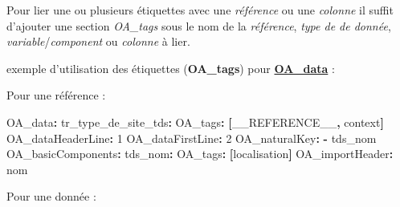 \documentclass[
  letterpaper,
  DIV=11,
  numbers=noendperiod]{scrartcl}
\newenvironment{Shaded}{\begin{snugshade}}{\end{snugshade}}
\newcommand{\AttributeTok}[1]{\textcolor[rgb]{0.40,0.45,0.13}{#1}}
\newcommand{\DecValTok}[1]{\textcolor[rgb]{0.68,0.00,0.00}{#1}}
\newcommand{\FunctionTok}[1]{\textcolor[rgb]{0.28,0.35,0.67}{#1}}
\newcommand{\KeywordTok}[1]{\textcolor[rgb]{0.00,0.23,0.31}{\textbf{#1}}}
\begin{document}
Pour lier une ou plusieurs étiquettes avec une \emph{référence} ou une
\emph{colonne} il suffit d'ajouter une section \emph{OA\_tags} sous le
nom de la \emph{référence}, \emph{type de de donnée},
\emph{variable}/\emph{component} ou \emph{colonne} à lier.

exemple d'utilisation des étiquettes (\textbf{OA\_tags}) pour
\hyperref[data]{\textbf{OA\_data}} :

Pour une référence :

\begin{Shaded}
\begin{Highlighting}[]
\FunctionTok{OA\_data}\KeywordTok{:}
\AttributeTok{  }\FunctionTok{tr\_type\_de\_site\_tds}\KeywordTok{:}
\AttributeTok{    }\FunctionTok{OA\_tags}\KeywordTok{:}\AttributeTok{ }\KeywordTok{[}\AttributeTok{\_\_REFERENCE\_\_}\KeywordTok{,}\AttributeTok{ context}\KeywordTok{]}
\AttributeTok{    }\FunctionTok{OA\_dataHeaderLine}\KeywordTok{:}\AttributeTok{ }\DecValTok{1}
\AttributeTok{    }\FunctionTok{OA\_dataFirstLine}\KeywordTok{:}\AttributeTok{ }\DecValTok{2}
\AttributeTok{    }\FunctionTok{OA\_naturalKey}\KeywordTok{:}
\AttributeTok{      }\KeywordTok{{-}}\AttributeTok{ tds\_nom}
\AttributeTok{    }\FunctionTok{OA\_basicComponents}\KeywordTok{:}
\AttributeTok{      }\FunctionTok{tds\_nom}\KeywordTok{:}\AttributeTok{ }
\AttributeTok{        }\FunctionTok{OA\_tags}\KeywordTok{:}\AttributeTok{ }\KeywordTok{[}\AttributeTok{localisation}\KeywordTok{]}
\AttributeTok{        }\FunctionTok{OA\_importHeader}\KeywordTok{:}\AttributeTok{ nom}
\end{Highlighting}
\end{Shaded}

Pour une donnée :
\end{document}
